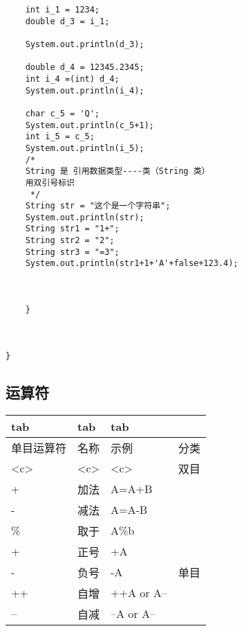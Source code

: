 \documentclass[11pt]{article}
\begin{document}
\begin{enumerate}
\begin{verbatim}
	int i_1 = 1234;
	double d_3 = i_1;

	System.out.println(d_3);

	double d_4 = 12345.2345;
	int i_4 =(int) d_4;
	System.out.println(i_4);

	char c_5 = 'Q';
	System.out.println(c_5+1);
	int i_5 = c_5;
	System.out.println(i_5);
	/*
	String 是 引用数据类型----类（String 类）
	用双引号标识
	 */
	String str = "这个是一个字符串";
	System.out.println(str);
	String str1 = "1+";
	String str2 = "2";
	String str3 = "=3";
	System.out.println(str1+1+'A'+false+123.4);



    }



}
\end{verbatim}
\end{enumerate}





\subsection{运算符}
\label{sec:orgf8d8497}


\begin{center}
\begin{tabular}{llll}
tab & tab & tab & \\
\hline
单目运算符 & 名称 & 示例 & 分类\\
\hline
<c> & <c> & <c> & 双目\\
+ & 加法 & A=A+B & \\
- & 减法 & A=A-B & \\
\% & 取于 & A\%b & \\
\hline
+ & 正号 & +A & \\
- & 负号 & -A & 单目\\
++ & 自增 & ++A or A-- & \\
-- & 自减 & --A or A-- & \\
\hline
\end{tabular}
\end{center}
\end{document}
